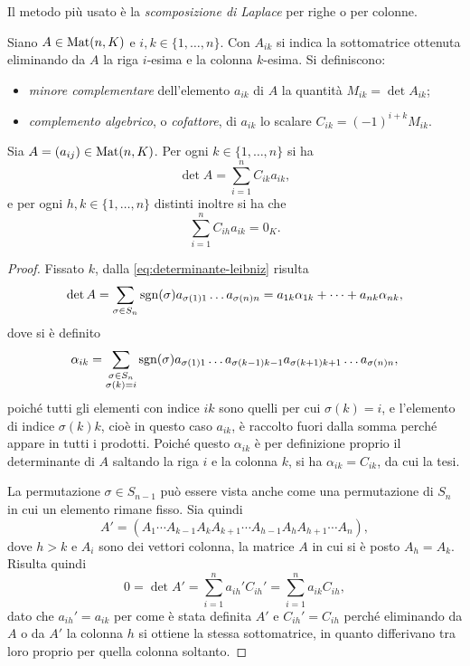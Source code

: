 Il metodo più usato è la \emph{scomposizione di Laplace} per righe o per colonne.
\begin{definizione} \label{d:minori-complementi}
	Siano $A\in\operatorname{Mat}(n,K)$ e $i,k\in\{1,\dots,n\}$.
	Con $A_{ik}$ si indica la sottomatrice ottenuta eliminando da $A$ la riga $i$-esima e la colonna $k$-esima.
	Si definiscono:
	\begin{itemize}
		\item \emph{minore complementare} dell'elemento $a_{ik}$ di $A$ la quantità $M_{ik}=\det A_{ik}$;
		\item \emph{complemento algebrico}, o \emph{cofattore}, di $a_{ik}$ lo scalare $C_{ik}=(-1)^{i+k}M_{ik}$.
	\end{itemize}
\end{definizione}
\begin{teorema}[di Laplace] \label{t:sviluppo-laplace}
	Sia $A=(a_{ij})\in\operatorname{Mat}(n,K)$.
	Per ogni $k\in\{1,\dots,n\}$ si ha
	\begin{equation} \label{eq:det-laplace1}
		\det A=\sum_{i=1}^nC_{ik}a_{ik},
	\end{equation}
	e per ogni $h,k\in\{1,\dots,n\}$ distinti inoltre si ha che
	\begin{equation} \label{eq:det-laplace2}
		\sum_{i=1}^nC_{ih}a_{ik}=0_K.
	\end{equation}
\end{teorema}
\begin{proof}
	Fissato $k$, dalla \eqref{eq:determinante-leibniz} risulta
	\begin{equation*}
		\det A=\sum_{\sigma\in S_n}\operatorname{sgn}(\sigma)a_{\sigma(1)1}\dots a_{\sigma(n)n}=a_{1k}\alpha_{1k}+\dots+a_{nk}\alpha_{nk},
	\end{equation*}
	dove si è definito
	\begin{equation*}
		\alpha_{ik}=\sum_{\substack{\sigma\in S_n\\\sigma(k)=i}}\operatorname{sgn}(\sigma)a_{\sigma(1)1}\dots a_{\sigma(k-1)k-1}a_{\sigma(k+1)k+1}\dots a_{\sigma(n)n},
	\end{equation*}
	poiché tutti gli elementi con indice $ik$ sono quelli per cui $\sigma(k)=i$, e l'elemento di indice $\sigma(k)k$, cioè in questo caso $a_{ik}$, è raccolto fuori dalla somma perché appare in tutti i prodotti.
	Poiché questo $\alpha_{ik}$ è per definizione proprio il determinante di $A$ saltando la riga $i$ e la colonna $k$, si ha $\alpha_{ik}=C_{ik}$, da cui la tesi.

	La permutazione $\sigma\in S_{n-1}$ può essere vista anche come una permutazione di $S_n$ in cui un elemento rimane fisso. Sia quindi
	\begin{equation*}
		A'=(A_1\cdots A_{k-1}A_kA_{k+1}\cdots A_{h-1}A_hA_{h+1}\cdots A_n),
	\end{equation*}
	dove $h>k$ e $A_i$ sono dei vettori colonna, la matrice $A$ in cui si è posto $A_h=A_k$. Risulta quindi
	\begin{equation*}
		0=\det A'=\sum_{i=1}^na_{ih}'C_{ih}'=\sum_{i=1}^na_{ik}C_{ih},
	\end{equation*}
	dato che $a_{ih}'=a_{ik}$ per come è stata definita $A'$ e $C_{ih}'=C_{ih}$ perché eliminando da $A$ o da $A'$ la colonna $h$ si ottiene la stessa sottomatrice, in quanto differivano tra loro proprio per quella colonna soltanto.
\end{proof}
